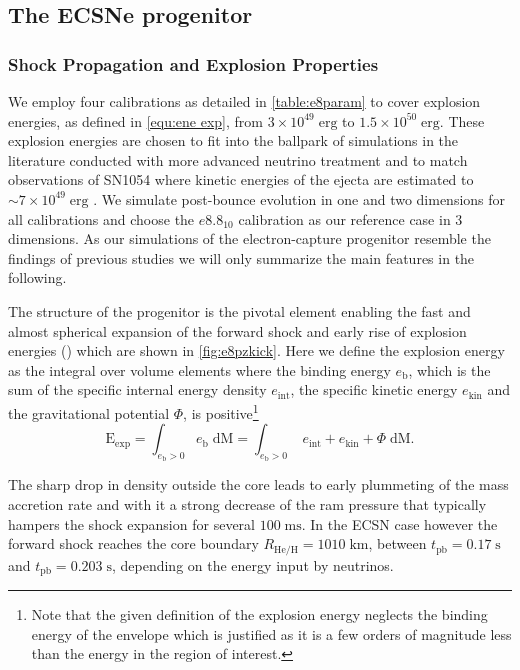 \documentclass[fleqn,usenatbib]{mnras}
\begin{document}
\subsection{The ECSNe progenitor}
\subsubsection{Shock Propagation and Explosion Properties}
\label{sec:explosion ecsn}

We employ four calibrations as detailed in \autoref{table:e8param} to cover explosion energies, as defined in \autoref{equ:ene exp}, from $3\times 10^{49}\;\mathrm{erg}$ to $1.5\times 10^{50}\;\mathrm{erg}$. These explosion energies are chosen to fit into the ballpark of simulations in the literature conducted with more advanced neutrino treatment and to match observations of SN1054 where kinetic energies of the ejecta are estimated to $\sim 7 \times 10^{49}\;\mathrm{erg}$ \cite{Smith2013}. We simulate post-bounce evolution in one and two dimensions for all calibrations and choose the $e8.8_{10}$ calibration as our reference case in 3 dimensions. 
As our simulations of the electron-capture progenitor resemble the findings of previous studies we will only summarize the main features in the following.

The structure of the progenitor is the pivotal element enabling the fast and almost spherical expansion of the forward shock and early rise of explosion energies (\citealt{Kitaura2006,Janka2008,Gessner2018}) which are shown in \autoref{fig:e8pzkick}. 
Here we define the explosion energy as the integral over volume elements where the binding energy $e_\mathrm{b}$, which is the sum of the specific internal energy density $e_{\mathrm{int}}$, the specific kinetic energy $e_{\mathrm{kin}}$ and the gravitational potential $\Phi$, is positive\footnote{Note that the given definition of the explosion energy neglects the binding energy of the envelope which is justified as it is a few orders of magnitude less than the energy in the region of interest.}
\begin{equation}
    \mathrm{E}_{\mathrm{exp}} = \int_{e_{\mathrm{b}} > 0} e_{\mathrm{b}} \; \mathrm{dM} =
    \int_{e_{\mathrm{b}} > 0}\; e_{\mathrm{int}} + e_{\mathrm{kin}} + \Phi \; \mathrm{dM}.
    \label{equ:ene exp}
\end{equation}

The sharp drop in density outside the core leads to early plummeting of the mass accretion rate and with it a strong decrease of the ram pressure that typically hampers the shock expansion for several $100\;\mathrm{ms}$. In the ECSN case however the forward shock reaches the core boundary $R_{\mathrm{He/H}}=1010\;\mathrm{km}$, between $t_{\mathrm{pb}}=0.17\;\mathrm{s}$ and $t_{\mathrm{pb}}=0.203\;\mathrm{s}$, depending on the energy input by neutrinos.
\end{document}
